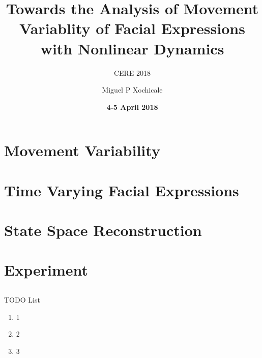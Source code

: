 \documentclass[compress]{beamer}
\title{Towards the Analysis of Movement Variablity of Facial Expressions  \\ 
	with Nonlinear Dynamics}
\subtitle{CERE 2018}
\date{{\bf 4-5 April 2018}}
\author{Miguel P Xochicale}
\institute{School of Engineering \\{\bf University of Birmingham}}
\begin{document}

\maketitle





%
\section{Movement Variability}

\section{Time Varying Facial Expressions}

\section{State Space Reconstruction}







\section{Experiment}



\subsection{}
{
\begin{frame}{TODO List}


          \begin{enumerate}
              \item 1
              \item 2 
              \item 3 
          \end{enumerate}

\end{frame}
}
\end{document}
